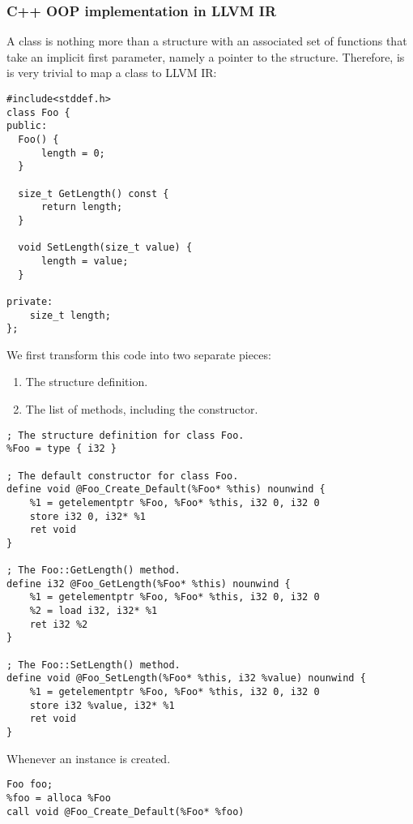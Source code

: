 \documentclass[a4paper]{exam}
\theoremstyle{definition}
\begin{document}
\subsubsection{C++ OOP implementation in LLVM IR\cite{llvmcpp}}
A class is nothing more than a structure with an associated set of functions that take an implicit first parameter, namely a pointer to the structure. Therefore, is is very trivial to map a class to LLVM IR:
\begin{verbatim}
#include<stddef.h>
class Foo {
public:
  Foo() {
      length = 0;
  }

  size_t GetLength() const {
      return length;
  }

  void SetLength(size_t value) {
      length = value;
  }

private:
    size_t length;
};
\end{verbatim}
We first transform this code into two separate pieces:
\begin{enumerate}
 \item The structure definition.
 \item The list of methods, including the constructor.
\end{enumerate}
\begin{verbatim}
; The structure definition for class Foo.
%Foo = type { i32 }

; The default constructor for class Foo.
define void @Foo_Create_Default(%Foo* %this) nounwind {
    %1 = getelementptr %Foo, %Foo* %this, i32 0, i32 0
    store i32 0, i32* %1
    ret void
}

; The Foo::GetLength() method.
define i32 @Foo_GetLength(%Foo* %this) nounwind {
    %1 = getelementptr %Foo, %Foo* %this, i32 0, i32 0
    %2 = load i32, i32* %1
    ret i32 %2
}

; The Foo::SetLength() method.
define void @Foo_SetLength(%Foo* %this, i32 %value) nounwind {
    %1 = getelementptr %Foo, %Foo* %this, i32 0, i32 0
    store i32 %value, i32* %1
    ret void
}
\end{verbatim}
Whenever an instance is created.
\begin{verbatim}
Foo foo;
%foo = alloca %Foo
call void @Foo_Create_Default(%Foo* %foo)
\end{verbatim}
\end{document}
